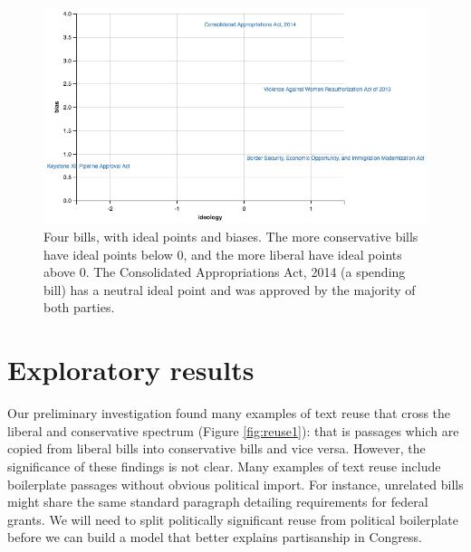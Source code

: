 \documentclass{article}
\begin{document}
\begin{figure}[h]
    \centering
    \includegraphics[width=0.9\linewidth]{ptbills} 
    \caption{Four bills, with ideal points and biases. The more conservative bills have ideal points below 0, and the more liberal have ideal points above 0. The Consolidated Appropriations Act, 2014 (a spending bill) has a neutral ideal point and  was approved by the majority of both parties.}
    \label{fig:ptbills}

\end{figure}

\section{Exploratory results}

Our preliminary investigation found many examples of text reuse that cross the liberal and conservative spectrum (Figure \ref{fig:reuse1}): that is passages which are copied from liberal bills into conservative bills and vice versa. However, the significance of these findings is not clear. Many examples of text reuse include boilerplate passages without obvious political import. For instance, unrelated bills might share the same standard paragraph detailing requirements for federal grants. We will need to split politically significant reuse from political boilerplate before we can build a model that better explains partisanship in Congress. 
\end{document}
